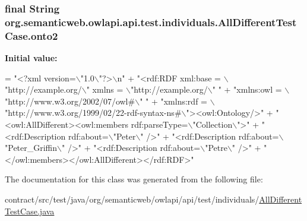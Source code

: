 \hypertarget{classorg_1_1semanticweb_1_1owlapi_1_1api_1_1test_1_1individuals_1_1_all_different_test_case_a59e05351435a2f577dd8713dd1c356ab}{
\subsubsection[{onto2}]{\setlength{\rightskip}{0pt plus 5cm}final String org.\-semanticweb.\-owlapi.\-api.\-test.\-individuals.\-All\-Different\-Test\-Case.\-onto2\hspace{0.3cm}{\ttfamily [private]}}}\label{classorg_1_1semanticweb_1_1owlapi_1_1api_1_1test_1_1individuals_1_1_all_different_test_case_a59e05351435a2f577dd8713dd1c356ab}
{\bfseries Initial value\-:}
\begin{DoxyCode}
= \textcolor{stringliteral}{"<?xml version=\(\backslash\)"1.0\(\backslash\)"?>\(\backslash\)n"}
            + \textcolor{stringliteral}{"<rdf:RDF xml:base = \(\backslash\)"http://example.org/\(\backslash\)" xmlns = \(\backslash\)"http://example.org/\(\backslash\)" "}
            + \textcolor{stringliteral}{"xmlns:owl = \(\backslash\)"http://www.w3.org/2002/07/owl#\(\backslash\)" "}
            + \textcolor{stringliteral}{"xmlns:rdf = \(\backslash\)"http://www.w3.org/1999/02/22-rdf-syntax-ns#\(\backslash\)"><owl:Ontology/>"}
            + \textcolor{stringliteral}{"<owl:AllDifferent><owl:members rdf:parseType=\(\backslash\)"Collection\(\backslash\)">"}
            + \textcolor{stringliteral}{"<rdf:Description rdf:about=\(\backslash\)"Peter\(\backslash\)" />"}
            + \textcolor{stringliteral}{"<rdf:Description rdf:about=\(\backslash\)"Peter\_Griffin\(\backslash\)" />"}
            + \textcolor{stringliteral}{"<rdf:Description rdf:about=\(\backslash\)"Petre\(\backslash\)" />"}
            + \textcolor{stringliteral}{"</owl:members></owl:AllDifferent></rdf:RDF>"}
\end{DoxyCode}


The documentation for this class was generated from the following file\-:\begin{DoxyCompactItemize}
\item 
contract/src/test/java/org/semanticweb/owlapi/api/test/individuals/\hyperlink{_all_different_test_case_8java}{All\-Different\-Test\-Case.\-java}\end{DoxyCompactItemize}
